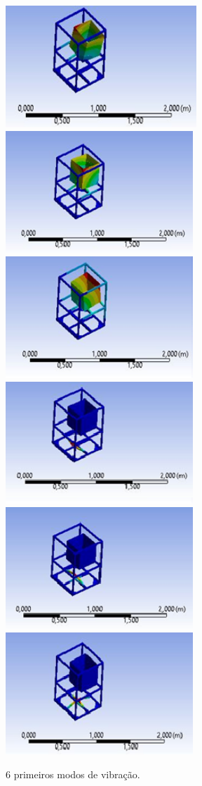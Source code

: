 \begin{enumerate}
	\begin{figure}[H]
		\centering
		\includegraphics[height=130pt]{figuras/modo1_1.png}
		\includegraphics[height=130pt]{figuras/modo1_2.png}
		\includegraphics[height=130pt]{figuras/modo1_3.png}
		\includegraphics[height=130pt]{figuras/modo1_4.png}
		\includegraphics[height=130pt]{figuras/modo1_5.png}
		\includegraphics[height=130pt]{figuras/modo1_6.png}
		\caption{6 primeiros modos de vibração.}
	\end{figure}
	

\end{enumerate}
